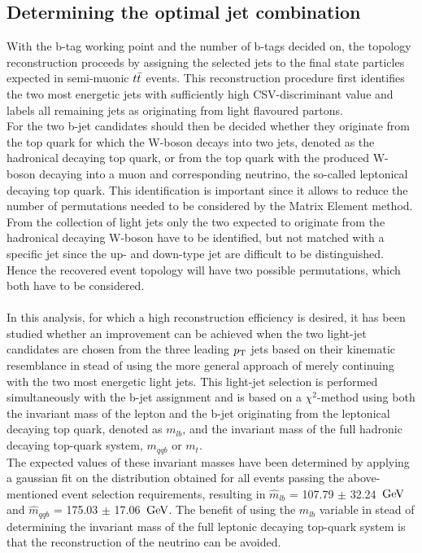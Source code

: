 \subsection{Determining the optimal jet combination}
With the b-tag working point and the number of b-tags decided on, the topology reconstruction proceeds by assigning the selected jets to the final state particles expected in semi-muonic $t\bar{t}$ events.
This reconstruction procedure first identifies the two most energetic jets with sufficiently high CSV-discriminant value and labels all remaining jets as originating from light flavoured partons.
\\
For the two b-jet candidates should then be decided whether they originate from the top quark for which the W-boson decays into two jets, denoted as the hadronical decaying top quark, or from the top quark with the produced W-boson decaying into a muon and corresponding neutrino, the so-called leptonical decaying top quark.
This identification is important since it allows to reduce the number of permutations needed to be considered by the Matrix Element method.
From the collection of light jets only the two expected to originate from the hadronical decaying W-boson have to be identified, but not matched with a specific jet since the up- and down-type jet are difficult to be distinguished. Hence the recovered event topology will have two possible permutations, which both have to be considered.
\\
\\
In this analysis, for which a high reconstruction efficiency is desired, it has been studied whether an improvement can be achieved when the two light-jet candidates are chosen from the three leading $p_{\rm T}$ jets based on their kinematic resemblance in stead of using the more general approach of merely continuing with the two most energetic light jets.
This light-jet selection is performed simultaneously with the b-jet assignment and is based on a $\chi^{2}$-method using both the invariant mass of the lepton and the b-jet originating from the leptonical decaying top quark, denoted as $m_{lb}$, and the invariant mass of the full hadronic decaying top-quark system, $m_{qqb}$ or $m_{t}$.
\\
The expected values of these invariant masses have been determined by applying a gaussian fit on the distribution obtained for all events passing the above-mentioned event selection requirements, resulting in $\hat{m}_{lb}$ =  107.79 $\pm$ 32.24 $\, \mathrm{GeV}$ and $\hat{m}_{qqb}$ = 175.03 $\pm$ 17.06 $\, \mathrm{GeV}$.
The benefit of using the $m_{lb}$ variable in stead of determining the invariant mass of the full leptonic decaying top-quark system is that the reconstruction of the neutrino can be avoided.
